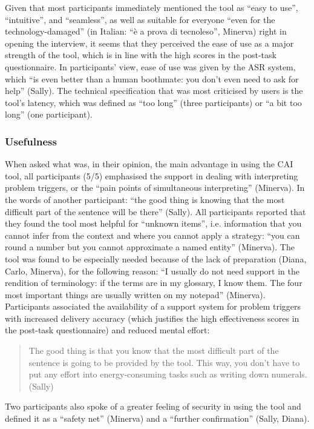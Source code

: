 Given that most participants immediately mentioned the tool as ``easy to use'', ``intuitive'', and ``seamless'', as well as suitable for everyone ``even for the tech\-nol\-o\-gy\nobreakdash-dam\-ag\-ed'' (in Italian: ``è a prova di tecnoleso'', Minerva) right in opening the interview, it seems that they perceived the ease of use as a major strength of the tool, which is in line with the high scores in the post-task questionnaire. In participants’ view, ease of use was given by the ASR system, which ``is even better than a human boothmate: you don’t even need to ask for help'' (Sally). The technical specification that was most criticised by users is the tool’s latency, which was defined as “too long” (three participants) or “a bit too long” (one participant).



\subsubsection{Usefulness}

When asked what was, in their opinion, the main advantage in using the CAI tool, all participants (5/5) emphasised the support in dealing with interpreting problem triggers, or the ``pain points of simultaneous interpreting'' (Minerva). In the words of another participant: ``the good thing is knowing that the most difficult part of the sentence will be there'' (Sally). All participants reported that they found the tool most helpful for ``unknown items'', i.e. information that you cannot infer from the context and where you cannot apply a strategy: ``you can round a number but you cannot approximate a named entity'' (Minerva). The tool was found to be especially needed because of the lack of preparation (Diana, Carlo, Minerva), for the following reason: ``I usually do not need support in the rendition of terminology: if the terms are in my glossary, I know them. The four most important things are usually written on my notepad'' (Minerva). Participants associated the availability of a support system for problem triggers with increased delivery accuracy (which justifies the high effectiveness scores in the post-task questionnaire) and reduced mental effort:

\begin{quote}
    The good thing is that you know that the most difficult part of the sentence is going to be provided by the tool. This way, you don’t have to put any effort into energy-consuming tasks such as writing down numerals. (Sally)
\end{quote}
Two participants also spoke of a greater feeling of security in using the tool and defined it as a ``safety net'' (Minerva) and a ``further confirmation'' (Sally, Diana).

